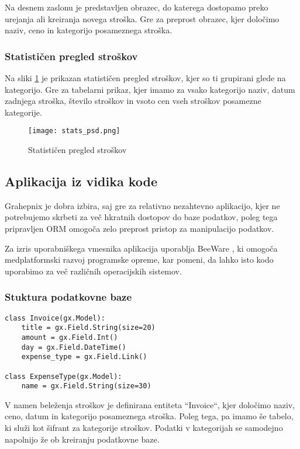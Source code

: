 \documentclass[a4paper,12pt,openright]{book}
\begin{document}
    Na desnem zaslonu je predstavljen obrazec, do katerega dostopamo preko urejanja ali kreiranja novega stroška. Gre za preprost obrazec, kjer določimo naziv, ceno in kategorijo posameznega stroška.

    \subsubsection{Statističen pregled stroškov}
    Na sliki \ref{stats_screen} je prikazan statističen pregled stroškov, kjer so ti grupirani glede na kategorijo. Gre za tabelarni prikaz, kjer imamo za vsako kategorijo naziv, datum zadnjega stroška, število stroškov in vsoto cen vseh stroškov posamezne kategorije.

    \begin{figure}[H]
        \centerline{\texttt{[image: stats\_psd.png]}}
        \caption{Statističen pregled stroškov}
        \label{stats_screen}
    \end{figure}

    \subsection{Aplikacija iz vidika kode}

    Grahepnix je dobra izbira, saj gre za relativno nezahtevno aplikacijo, kjer ne potrebujemo skrbeti za več hkratnih dostopov do baze podatkov, poleg tega pripravljen ORM omogoča zelo preprost pristop za manipulacijo podatkov.

    Za izris uporabniškega vmesnika aplikacija uporablja BeeWare \cite{BEE_WARE}, ki omogoča medplatformski razvoj programske opreme, kar pomeni, da lahko isto kodo uporabimo za več različnih operacijskih sistemov.

    \subsubsection{Stuktura podatkovne baze}

\begin{verbatim}
class Invoice(gx.Model):
    title = gx.Field.String(size=20)
    amount = gx.Field.Int()
    day = gx.Field.DateTime()
    expense_type = gx.Field.Link()

class ExpenseType(gx.Model):
    name = gx.Field.String(size=30)
\end{verbatim}

    \noindent
    V namen beleženja stroškov je definirana entiteta ``Invoice``, kjer določimo naziv, ceno, datum in kategorijo posameznega stroška.
    Poleg tega, pa imamo še tabelo, ki služi kot šifrant za kategorije stroškov. Podatki v kategorijah se samodejno napolnijo že ob kreiranju podatkovne baze.
\end{document}
